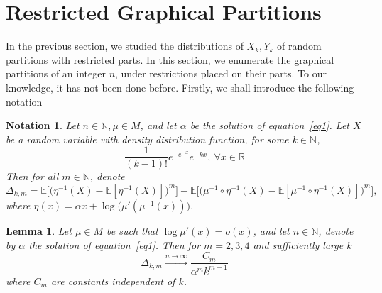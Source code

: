 \documentclass[pdflatex,sn-mathphys-num]{sn-jnl}%
\theoremstyle{thmstyleone}%
\theoremstyle{thmstyletwo}%
\theoremstyle{thmstylethree}%
\theoremstyle{thmstylethree}%
\newtheorem{lemma}{Lemma}%
\theoremstyle{thmstylethree}%
\newtheorem{notation}{Notation}%
\begin{document}
\section{Restricted Graphical Partitions}
In the previous section, we studied the distributions of $X_k,Y_k$ of random partitions with restricted parts. In this section, we enumerate the graphical partitions of an integer $n$, under restrictions placed on their parts. To our knowledge, it has not been done before. Firstly, we shall introduce the following notation
\begin{notation}
    Let $n\in\mathbb{N},\mu\in M$, and let $\alpha$ be the solution of equation~\eqref{eq1}. Let $X$ be a random variable with density distribution function, for some $k\in\mathbb{N}$,
    \begin{equation*}
        \frac{1}{(k-1)!}e^{-e^{-x}}e^{-kx}, \ \forall x\in\mathbb{R}
    \end{equation*}
    Then for all $m\in\mathbb{N}$, denote
    \begin{equation}\label{eq7}
        \Delta_{k,m}=\mathbb{E}\Big[\big(\eta^{-1}(X)-\mathbb{E}[\eta^{-1}(X)]\big)^m\Big]-\mathbb{E}\Big[\big(\mu^{-1}\circ\eta^{-1}(X)-\mathbb{E}[\mu^{-1}\circ\eta^{-1}(X)]\big)^m\Big],
    \end{equation}
    where $\eta(x)=\alpha x+\log\big(\mu'(\mu^{-1}(x))\big)$.
\end{notation}
\begin{lemma}\label{lemma3}
    Let $\mu\in M$ be such that $\log\mu'(x)=o(x)$, and let $n\in\mathbb{N}$, denote by $\alpha$ the solution of equation~\eqref{eq1}. Then for $m=2,3,4$ and sufficiently large $k$
    \begin{equation}\label{eq8}
        \Delta_{k,m}\xrightarrow{n\to\infty}\frac{C_m}{\alpha^m k^{m-1}}
    \end{equation}
    where $C_m$ are constants independent of $k$.
\end{lemma}
\end{document}
